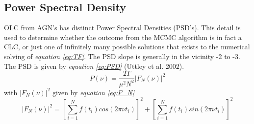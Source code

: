 \documentclass[twocolumn]{article}
\begin{document}
\subsection{Power Spectral Density}
OLC from AGN's has distinct Power Spectral Densities (PSD's). This detail is used to determine whether the outcome from the MCMC algorithm is in fact a CLC, or just one of infinitely many possible solutions that exists to the numerical solving of \emph{equation \ref{eq:TF}}. The PSD slope is generally in the vicinity -2 to -3. The PSD is given by \emph{equation \ref{eq:PSD}} (Uttley et al. 2002).
\begin{equation}
P(\nu) = \frac{2T}{\mu^2N^2}|F_N(\nu)|^2
\label{eq:PSD}
\end{equation}
with $|F_N(\nu)|^2$ given by \emph{equation \ref{eq:F_N}}
\begin{equation}
|F_N(\nu)|^2 = [\sum_{i=1}^{N}f(t_i)cos(2\pi\nu t_i)]^2 + [\sum_{i=1}^{N}f(t_i)sin(2\pi\nu t_i)]^2
\label{eq:F_N}
\end{equation}
\end{document}
